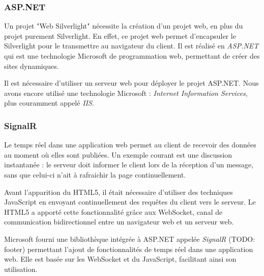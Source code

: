 \subsubsection{ASP.NET}

Un projet "Web Silverlight" nécessite la création d'un projet web, en plus du projet purement Silverlight. En effet, ce projet web permet d'encapsuler le Silverlight pour le transmettre au navigateur du client. Il est réalisé en \textit{ASP.NET} qui est une technologie Microsoft de programmation web, permettant de créer des sites dynamiques.

Il est nécessaire d'utiliser un serveur web pour déployer le projet ASP.NET. Nous avons encore utilisé une technologie Microsoft : \textit{Internet Information Services}, plus couramment appelé \textit{IIS}.

\subsubsection{SignalR}

Le temps réel dans une application web permet au client de recevoir des données au moment où elles sont publiées. Un exemple courant est une discussion instantanée : le serveur doit informer le client lors de la réception d'un message, sans que celui-ci n'ait à rafraichir la page continuellement.

Avant l'apparition du HTML5, il était nécessaire d'utiliser des techniques JavaScript en envoyant continuellement des requêtes du client vers le serveur. Le HTML5 a apporté cette fonctionnalité grâce aux WebSocket, canal de communication bidirectionnel entre un navigateur web et un serveur web.

Microsoft fourni une bibliothèque intégrée à ASP.NET appelée \textit{SignalR} (TODO: footer) permettant l'ajout de fonctionnalités de temps réel dans une application web. Elle est basée sur les WebSocket et du JavaScript, facilitant ainsi son utilisation.